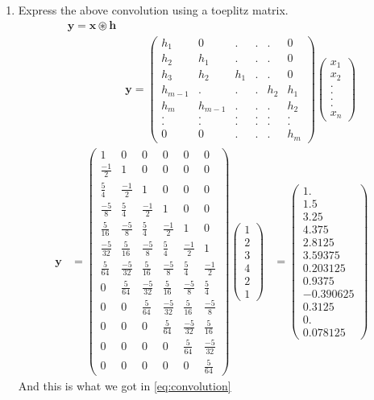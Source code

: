 \documentclass[journal,12pt,twocolumn]{IEEEtran}
\let\vec\mathbf
\newcommand{\myvec}[1]{\ensuremath{\begin{pmatrix}#1\end{pmatrix}}}
\renewcommand\thesection{\arabic{section}}
\begin{document}
\begin{enumerate}[label=\thesection.\arabic*]
\item Express the above convolution using a toeplitz matrix.
\solution
\begin{align}
\vec{y} = \vec{x} \circledast \vec{h}\\
& \vec{y} = \myvec{ h_1 & 0 & . & . & . & 0 \\ h_2 & h_1 & . & . & . & 0 \\ h_3 & h_2 & h_1 & . & . & 0 \\ h_{m-1} & . & . & . & h_2 & h_1 \\ h_m & h_{m-1} &. & . & . & h_2 \\ . & . &. & . & . & . \\ . & . & . & . & . & . \\ 0 & 0 & . & . & . & h_m } \myvec{x_1 \\ x_2 \\ . \\ . \\ . \\ . \\ x_n}
\end{align}
\begin{align}
\vec{y}&=\myvec{1 & 0&0 & 0 & 0 & 0 \\ \frac{-1}{2} & 1&0&0&0&0\\\frac{5}{4}&\frac{-1}{2}&1&0&0&0\\\frac{-5}{8}&\frac{5}{4}&\frac{-1}{2}&1&0&0\\\frac{5}{16}&\frac{-5}{8}&\frac{5}{4}&\frac{-1}{2}&1&0\\ \frac{-5}{32}&\frac{5}{16}&\frac{-5}{8}&\frac{5}{4}&\frac{-1}{2}&1\\\frac{5}{64}&\frac{-5}{32}&\frac{5}{16}&\frac{-5}{8}&\frac{5}{4}&\frac{-1}{2}\\ 0&\frac{5}{64}&\frac{-5}{32}&\frac{5}{16}&\frac{-5}{8}&\frac{5}{4}\\0&0&\frac{5}{64}&\frac{-5}{32}&\frac{5}{16}&\frac{-5}{8}\\0&0&0&\frac{5}{64}&\frac{-5}{32}&\frac{5}{16}\\0&0&0&0&\frac{5}{64}&\frac{-5}{32}\\0&0&0&0&0&\frac{5}{64}}\myvec{1\\2\\3\\4\\2\\1}
&=\myvec{1.   \\     1.5\\3.25\\4.375\\2.8125   \\3.59375\\   0.203125\\
  0.9375  \\ -0.390625 \\ 0.3125   \\ 0.     \\	   0.078125}
\end{align}
And this is what we got in \eqref{eq:convolution}


\end{enumerate}
\end{document}
